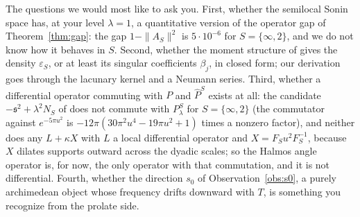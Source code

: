 \documentclass[11pt]{amsart}
\theoremstyle{definition}
\theoremstyle{remark}
\newcommand{\Pih}{\widehat P}
\begin{document}
The questions we would most like to ask you. First, whether the semilocal Sonin space has, at your level $\lambda=1$, a
quantitative version of the operator gap of Theorem~\ref{thm:gap}: the gap $1-\|A_S\|^2$ is $5\cdot10^{-6}$ for $S=\{\infty,2\}$,
and we do not know how it behaves in $S$. Second, whether the moment structure of \cite{CCM2024} gives the density
$\varepsilon_S$, or at least its singular coefficients $\beta_j$, in closed form; our derivation goes through the lacunary kernel
and a Neumann series. Third, whether a differential operator commuting with $P$ and $\Pih^S$ exists at all: the candidate
$-\mathfrak s^2+\lambda^2N_S$ of \cite{CCM2023} does not commute with $P_\lambda^S$ for $S=\{\infty,2\}$ (the commutator against
$e^{-5\pi u^2}$ is $-12\pi(30\pi^2u^4-19\pi u^2+1)$ times a nonzero factor), and neither does any $L+\kappa X$ with $L$ a local
differential operator and $X=F_Su^2F_S^{-1}$, because $X$ dilates supports outward across the dyadic scales; so the Halmos
angle operator is, for now, the only operator with that commutation, and it is not differential. Fourth, whether the
direction $s_0$ of Observation~\ref{obs:s0}, a purely archimedean object whose frequency drifts downward with $T$, is something you
recognize from the prolate side.
\end{document}
